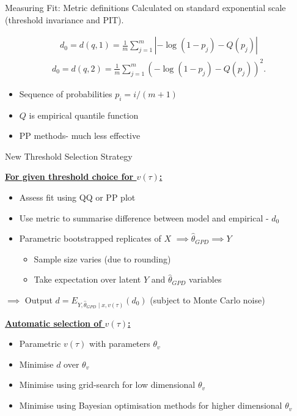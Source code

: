 \begin{frame}{Measuring Fit: Metric definitions}
Calculated on standard exponential scale (threshold invariance and PIT).

\begin{align*}
    d_0=d(q,1) = \frac{1}{m} \sum_{j=1}^{m} |-\log(1-p_j) - Q(p_j)|
\end{align*}
\begin{align*}
    d_0=d(q,2) = \frac{1}{m} \sum_{j=1}^{m} (-\log(1-p_j) - Q(p_j))^2.
\end{align*}
%
\begin{itemize}
\item Sequence of probabilities $p_i=i/(m+1)$\\
\item $Q$ is empirical quantile function
\item PP methods- much less effective
\end{itemize}

\end{frame}

\begin{frame}{New Threshold Selection Strategy}%

\underline{\textbf{For given threshold choice for $v(\tau)$:}}
\begin{itemize}
\item Assess fit using QQ or PP plot
\item Use metric to summarise difference between model and empirical - $d_0$
\item Parametric bootstrapped replicates of $X$ $\implies \hat{\theta}_{GPD} \implies Y$ 
\begin{itemize}
\item Sample size varies (due to rounding)
\item Take expectation over latent $Y$ and $\hat{\theta}_{GPD}$ variables
\end{itemize}
\end{itemize}
$\implies$ Output
$d=E_{Y, \hat{\theta}_{GPD}\mid x,v(\tau)}(d_0)$  (subject to Monte Carlo noise)

\pause

\underline{\textbf{Automatic selection of $v(\tau)$:}}
\begin{itemize}
\item Parametric $v(\tau)$ with parameters $\theta_v$
\item Minimise $d$ over $\theta_v$
\item Minimise using grid-search for low dimensional $\theta_v$
\item Minimise using Bayesian optimisation methods for higher dimensional $\theta_v$
\end{itemize}
\end{frame}


